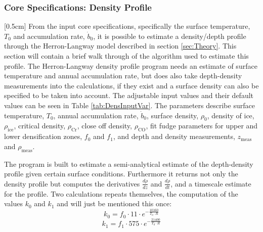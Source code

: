\documentclass[../../CompleteThesis/Complete_1stDraft.tex]{subfiles}
\begin{document}
\subsubsection[Density Profile]{Core Specifications: Density Profile}
[0.5cm]%
From the input core specifications, specifically the surface temperature, $T_0$ and accumulation rate, $\dot{b}_0$, it is possible to estimate a density/depth profile through the Herron-Langway model described in section \ref{sec:Theory}. This section will contain a brief walk through of the algorithm used to estimate this profile.
The Herron-Langway density profile program needs an estimate of surface temperature and annual accumulation rate, but does also take depth-density measurements into the calculations, if they exist and a surface density can also be specified to be taken into account. The adjustable input values and their default values can be seen in Table \ref{tab:DensInputVar}. The parameters describe surface temperature, $T_0$, annual accumulation rate, $\dot{b}_0$, surface density, $\rho_0$, density of ice, $\rho_{\text{ice}}$, critical density, $\rho_{\text{Cr}}$, close off density, $\rho_{\text{CO}}$, fit fudge parameters for upper and lower densification zones, $f_0$ and $f_1$, and depth and density measurements, $z_{\text{meas}}$ and $\rho_{\text{meas}}$. 

The program is built to estimate a semi-analytical estimate of the depth-density profile given certain surface conditions. Furthermore it returns not only the density profile but computes the derivatives $\frac{d\rho}{dz}$ and $\frac{d\rho}{dt}$, and a timescale estimate for the profile. Two calculations repeats themselves, the computation of the values $k_0$ and $k_1$ and will just be mentioned this once:
\begin{equation}
	k_0 = f_0\cdot 11\cdot e^{-\frac{10160}{T_0\cdot R}}
	\label{Eq:k0}
\end{equation}
\begin{equation}
	k_1 = f_1\cdot 575\cdot e^{-\frac{21400}{T_0\cdot R}}
	\label{Eq:k1}
\end{equation}
\end{document}
